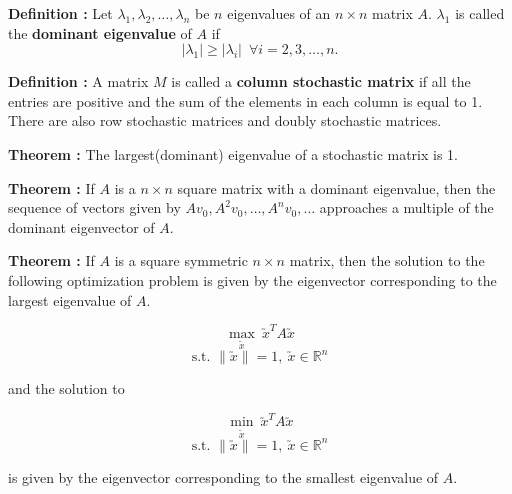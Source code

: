 \documentclass[11pt, a4paper]{article}
\begin{document}
\vspace{0.3cm}

\leftpointright \hspace{0.3cm} \textbf{Definition : } Let $\lambda_1, \lambda_2, \ldots, \lambda_n$ be $n$ eigenvalues of an $n \times n$ matrix $A$. $\lambda_1$ is called the \textbf{dominant eigenvalue} of $A$ if $$|\lambda_1| \geq |\lambda_i| \,\,\, \forall i = 2, 3, \ldots, n.$$

\leftpointright \hspace{0.3cm} \textbf{Definition : } A matrix $M$ is called a \textbf{column stochastic matrix} if all the entries are positive and the sum of the elements in each column is equal to 1. \\

\hspace{1cm} There are also row stochastic matrices and doubly stochastic matrices. \\

\newpage

\leftpointright \hspace{0.3cm} \textbf{Theorem : } The largest(dominant) eigenvalue of a stochastic matrix is 1. \\

\vspace{0.3cm}

\leftpointright \hspace{0.3cm}  \textbf{Theorem : } If $A$ is a $n \times n$ square matrix with a dominant eigenvalue, then the sequence of vectors given by $Av_0, A^2v_0, \ldots , A^nv_0, \ldots$ approaches a multiple of the dominant eigenvector of $A$.

\vspace{0.3cm}

\leftpointright \hspace{0.3cm}  \textbf{Theorem : } If $A$ is a square symmetric $n \times n$ matrix, then the solution to the following optimization problem is given by the eigenvector corresponding to the largest eigenvalue of $A$.

\[
\max_{\utilde{x}} \ \utilde{x}^T A \utilde{x} 
\]
\[
\text{s.t. } \|\utilde{x}\| = 1, \ \utilde{x} \in \mathbb{R}^n
\]

and the solution to

\[
\min_{\utilde{x}} \ \utilde{x}^T A \utilde{x} 
\]
\[
\text{s.t. } \|\utilde{x}\| = 1, \ \utilde{x} \in \mathbb{R}^n
\]

is given by the eigenvector corresponding to the smallest eigenvalue of $A$. \\
\end{document}

